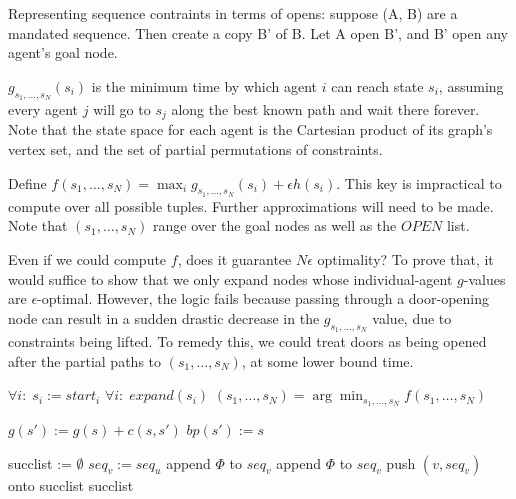 \documentclass[letterpaper]{article}
\begin{document}
Representing sequence contraints in terms of opens: suppose (A, B) are a mandated sequence. Then create a copy B' of B. Let A open B', and B' open any agent's goal node.

$g_{s_1,\ldots,s_N}(s_i)$ is the minimum time by which agent $i$ can reach state $s_i$, assuming every agent $j$ will go to $s_j$ along the best known path and wait there forever. Note that the state space for each agent is the Cartesian product of its graph's vertex set, and the set of partial permutations of constraints.

Define $f(s_1,\ldots,s_N) = \max_i g_{s_1,\ldots,s_N}(s_i) + \epsilon h(s_i)$. This key is impractical to compute over all possible tuples. Further approximations will need to be made. Note that $(s_1,\ldots,s_N)$ range over the goal nodes as well as the $OPEN$ list.

Even if we could compute $f$, does it guarantee $N\epsilon$ optimality? To prove that, it would suffice to show that we only expand nodes whose individual-agent $g$-values are $\epsilon$-optimal. However, the logic fails because passing through a door-opening node can result in a sudden drastic decrease in the $g_{s_1,\ldots,s_N}$ value, due to constraints being lifted. To remedy this, we could treat doors as being opened after the partial paths to $(s_1,\ldots,s_N)$, at some lower bound time.

\begin{algorithm}
\caption{$MultiAgent A^*()$}
\label{alg:update}
\begin{algorithmic}
\STATE $\forall i:\; s_i := start_i$
\STATE $\forall i:\; expand(s_i)$
\STATE $(s_1,\ldots,s_N) = \arg\min_{s_1,\ldots,s_N} f(s_1,\ldots,s_N)$
\ENDWHILE
\end{algorithmic}
\end{algorithm}

\begin{algorithm}
\caption{$expand(s)$}
\label{alg:update}
\begin{algorithmic}
\STATE $g(s') := g(s) + c(s,s')$
\STATE $bp(s') := s$
\ENDIF
\ENDFOR
\end{algorithmic}
\end{algorithm}

\begin{algorithm}
\caption{$successors(u, seq_u)$}
\label{alg:update}
\begin{algorithmic}
\STATE succlist := $\emptyset$
\STATE $seq_v := seq_u$
\STATE append $\Phi$ to $seq_v$
\ENDIF
{}
\STATE append $\Phi$ to $seq_v$
\ENDIF
\STATE push $(v,seq_v)$ onto succlist
\ENDFOR
\RETURN succlist
\end{algorithmic}
\end{algorithm}



\end{document}
